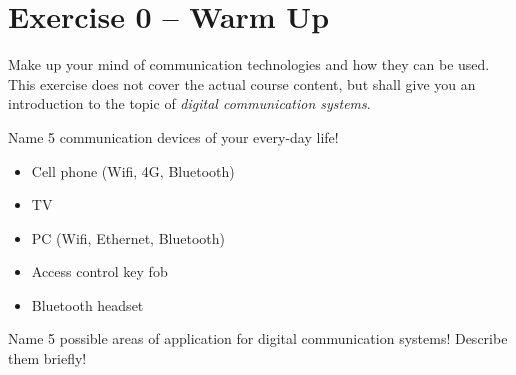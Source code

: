 {}
\section*{Exercise 0 -- Warm Up}

Make up your mind of communication technologies and how they can be used. This exercise does not cover the actual course content, but shall give you an introduction to the topic of \emph{digital communication systems}.

\begin{question}
	Name 5 communication devices of your every-day life!
\end{question}

\begin{solution}
	\begin{itemize}
		\item Cell phone (Wifi, 4G, Bluetooth)
		\item TV
		\item PC (Wifi, Ethernet, Bluetooth)
		\item Access control key fob
		\item Bluetooth headset
	\end{itemize}
\end{solution}

\begin{question}
	Name 5 possible areas of application for digital communication systems! Describe them briefly!
\end{question}